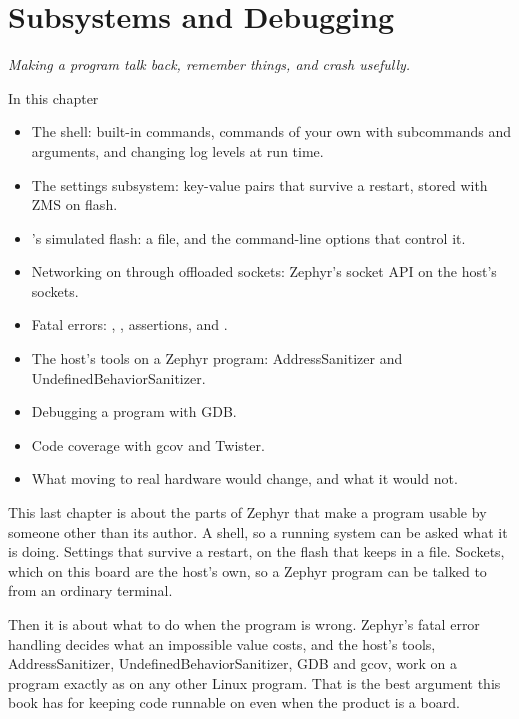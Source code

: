 
\chapter{Subsystems and Debugging}
\label{c6:ch:subsystems}\label{c6:ch}

{\large\itshape Making a program talk back, remember things, and crash usefully.\par}

\begin{chapterbox}{In this chapter}
\begin{itemize}
  \item The shell: built-in commands, commands of your own with subcommands and arguments, and changing log
    levels at run time.
  \item The settings subsystem: key-value pairs that survive a restart, stored with ZMS on flash.
  \item {}’s simulated flash: a file, and the command-line options that control it.
  \item Networking on  through offloaded sockets: Zephyr’s socket API on the host’s
    sockets.
  \item Fatal errors: , , assertions, and .
  \item The host’s tools on a Zephyr program: AddressSanitizer and UndefinedBehaviorSanitizer.
  \item Debugging a  program with GDB.
  \item Code coverage with gcov and Twister.
  \item What moving to real hardware would change, and what it would not.
\end{itemize}
\end{chapterbox}

This last chapter is about the parts of Zephyr that make a program usable by someone other than its
author. A shell, so a running system can be asked what it is doing. Settings that survive a restart,
on the flash that  keeps in a file. Sockets, which on this board are the host's
own, so a Zephyr program can be talked to from an ordinary terminal.

Then it is about what to do when the program is wrong. Zephyr's fatal error handling decides what an
impossible value costs, and the host's tools, AddressSanitizer, UndefinedBehaviorSanitizer, GDB and
gcov, work on a  program exactly as on any other Linux program. That is the best
argument this book has for keeping code runnable on  even when the product is a
board.





